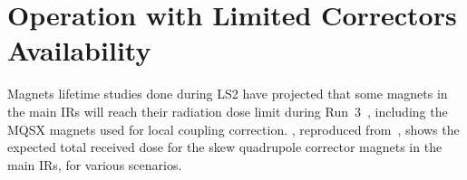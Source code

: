 \section{Operation with Limited Correctors Availability}
\label{section:limited_correctors_availability}

Magnets lifetime studies done during LS\num{2} have projected that some magnets in the main IRs will reach their radiation dose limit during Run~\num{3}~\cite{PRES:Cerutti:TripletLifetime_Evian}, including the MQSX magnets used for local coupling correction.
, reproduced from~\cite{PRES:Cerutti:TripletLifetime_Evian}, shows the expected total received dose for the skew quadrupole corrector magnets in the main IRs, for various scenarios.

